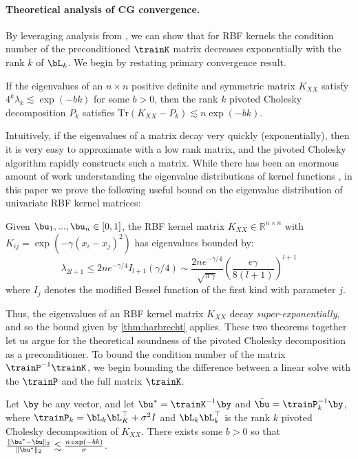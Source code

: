 \paragraph{Theoretical analysis of CG convergence.}
By leveraging analysis from \cite{harbrecht2012low}, we can show that for RBF kernels the condition number of the preconditioned $\trainK$ matrix decreases exponentially with the rank $k$ of $\bL_k$.
We begin by restating \cite{harbrecht2012low} primary convergence result.
%
\begin{theorem}
If the eigenvalues of an $n \times n$ positive definite and symmetric matrix $K_{XX}$ satisfy $4^{k}\lambda_{k} \lesssim \exp(-bk)$ for some $b>0$, then
the rank $k$ pivoted Cholesky decomposition $P_{k}$ satisfies $\textrm{Tr}(K_{XX} - P_{k}) \lesssim n\exp(-bk)$.
\label{thm:harbrecht}
\end{theorem}
Intuitively, if the eigenvalues of a matrix decay very quickly (exponentially), then it is very easy to approximate with a low rank matrix, and the pivoted Cholesky algorithm rapidly constructs such a matrix.
While there has been an enormous amount of work understanding the eigenvalue distributions of kernel functions , in this paper we prove the following useful bound on the eigenvalue distribution of univariate RBF kernel matrices:
%
\begin{theorem}
\label{thm:eigenvalue_bound}
Given $\bu_1,...,\bu_n \in [0, 1]$, the RBF kernel matrix $K_{XX} \in \mathbb{R}^{n \times n}$ with $K_{ij} = \exp \left(-\gamma(x_i - x_j)^{2}\right)$ has eigenvalues bounded by:
\begin{equation*}
    \lambda_{2l+1} \leq
    2n e^{-\gamma/4} I_{l+1}(\gamma/4) \sim
    \frac{2n e^{-\gamma/4}}{\sqrt{\pi\gamma}}
    \left( \frac{e\gamma}{8(l+1)} \right)^{l+1}
\end{equation*}
where $I_j$ denotes the modified Bessel function of the first kind with parameter $j$.
\end{theorem}
%
Thus, the eigenvalues of an RBF kernel matrix $K_{XX}$ decay \emph{super-exponentially}, and so the bound given by \autoref{thm:harbrecht} applies.
These two theorems together let us argue for the theoretical soundness of the pivoted Cholesky decomposition as a preconditioner.
To bound the condition number of the matrix $\trainP^{-1} \trainK$, we begin bounding the difference between a linear solve with the $\trainP$ and the full matrix $\trainK$.
%
\begin{theorem}
Let $\by$ be any vector, and let $\bu^{*} = \trainK^{-1}\by$ and $\tilde{\bu} = \trainP_{k}^{-1}\by$, where $\trainP_{k}=\bL_{k} \bL_K^\top + \sigma^{2}I$ and $\bL_{k} \bL_k^\top$ is the rank $k$ pivoted Cholesky decomposition of $K_{XX}$.
There exists some $b>0$ so that $\frac{\Vert \bu^{*} - \tilde{\bu}\Vert_{2}}{\Vert\bu^{*}\Vert_{2}} \lesssim \frac{n\exp(-bk)}{\sigma}$.
\end{theorem}
